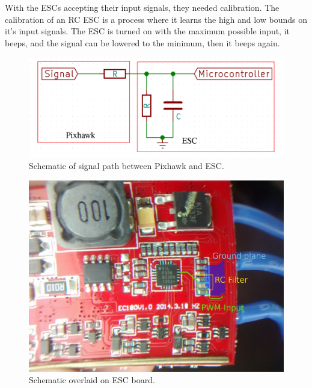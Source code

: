 With the ESCs accepting their input signals, they needed calibration. The calibration of an RC ESC is a process where it learns the high and low bounds on it's input signals. The ESC is turned on with the maximum possible input, it beeps, and the signal can be lowered to the minimum, then it beeps again.


\begin{figure}[H]
\centering
  \includegraphics[width=\linewidth]{figs/divider.png}
  \caption{Schematic of signal path between Pixhawk and ESC.}
  \label{fig:divider}
\end{figure}
	
\begin{figure}[H]
\centering
  \includegraphics[width=0.7\linewidth]{figs/escbeforeschematic.jpg}
  \caption{Schematic overlaid on ESC board.}
  \label{fig:divider}
\end{figure}
	


